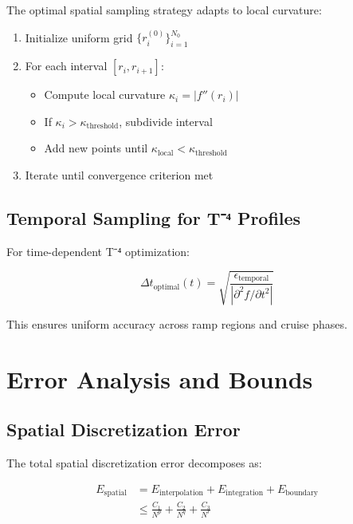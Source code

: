 \documentclass[12pt,a4paper]{article}
\begin{document}
The optimal spatial sampling strategy adapts to local curvature:

\begin{algorithm}
\begin{enumerate}
\item Initialize uniform grid $\{r_i^{(0)}\}_{i=1}^{N_0}$
\item For each interval $[r_i, r_{i+1}]$:
   \begin{itemize}
   \item Compute local curvature $\kappa_i = |f''(r_i)|$
   \item If $\kappa_i > \kappa_{\text{threshold}}$, subdivide interval
   \item Add new points until $\kappa_{\text{local}} < \kappa_{\text{threshold}}$
   \end{itemize}
\item Iterate until convergence criterion met
\end{enumerate}
\end{algorithm}

\subsection{Temporal Sampling for T⁻⁴ Profiles}

For time-dependent T⁻⁴ optimization:

\begin{equation}
\Delta t_{\text{optimal}}(t) = \sqrt{\frac{\epsilon_{\text{temporal}}}{|\partial^2 f / \partial t^2|}}
\end{equation}

This ensures uniform accuracy across ramp regions and cruise phases.

\section{Error Analysis and Bounds}

\subsection{Spatial Discretization Error}

The total spatial discretization error decomposes as:

\begin{align}
E_{\text{spatial}} &= E_{\text{interpolation}} + E_{\text{integration}} + E_{\text{boundary}} \\
&\leq \frac{C_1}{N^p} + \frac{C_2}{N^{q}} + \frac{C_3}{N^r}
\end{align}
\end{document}
